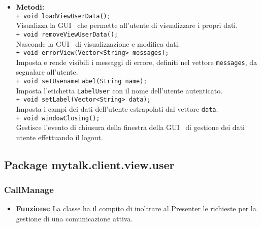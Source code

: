{\begin{sloppypar}
{{\begin{itemize}
			\item[] \textbf{Metodi:}\\
				\texttt{+ void loadViewUserData();}\\
				Visualizza la GUI\g~ che permette all'utente di visualizzare i propri dati.\\
				
				\texttt{+ void removeViewUserData();}\\
				Nasconde la GUI\g~ di visualizzazione e modifica dati.\\
				
				\texttt{+ void errorView(Vector<String> messages);}\\
				Imposta e rende visibili i messaggi di errore, definiti nel vettore \texttt{messages}, da segnalare all'utente.\\
				
				\texttt{+ void setUsenameLabel(String name);}\\
				Imposta l’etichetta \texttt{LabelUser} con il nome dell’utente autenticato.\\
				
				\texttt{+ void setLabel(Vector<String> data);}\\
				Imposta i campi dei dati dell'utente estrapolati dal vettore \texttt{data}.\\
				
				\texttt{+ void windowClosing();}\\
				Gestisce l'evento di chiusura della finestra della GUI\g~ di gestione dei dati utente effettuando il logout.\\
		\end{itemize}
		}
		
	}
	
	\subsection{Package mytalk.client.view.user} {

		\subsubsection{CallManage}\label{ssub:CallManage}{
		\begin{itemize}
			\item[]  \textbf{Funzione:} La classe ha il compito di inoltrare al Presenter le richieste per la gestione di una comunicazione attiva.\\
				

\end{itemize}}}
\end{sloppypar}}
